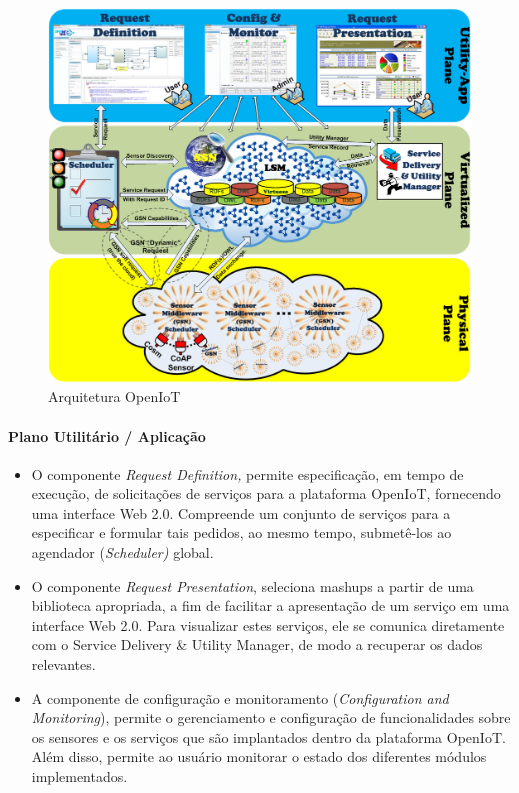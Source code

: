 \begin{figure}
\begin{centering}
\includegraphics[width=1\linewidth]{Imagens/Cap_3/OpenIoT-Architecture}
\par\end{centering}
\caption{Arquitetura OpenIoT \cite{ZShelby2009} \label{fig:OpenIoT}}
\end{figure}


\paragraph*{Plano Utilitário / Aplicação }
\begin{itemize}
\item O componente \emph{Request Definition,} permite especificação, em
tempo de execução, de solicitações de serviços para a plataforma OpenIoT,
fornecendo uma interface Web 2.0. Compreende um conjunto de serviços
para a especificar e formular tais pedidos, ao mesmo tempo, submetê-los
ao agendador (\emph{Scheduler)} global.
\item O componente \emph{Request Presentation}, seleciona mashups a partir
de uma biblioteca apropriada, a fim de facilitar a apresentação de
um serviço em uma interface Web 2.0. Para visualizar estes serviços,
ele se comunica diretamente com o Service Delivery \& Utility Manager,
de modo a recuperar os dados relevantes.
\item A componente de configuração e monitoramento (\emph{Configuration
and Monitoring}), permite o gerenciamento e configuração de funcionalidades
sobre os sensores e os serviços que são implantados dentro da plataforma
OpenIoT. Além disso, permite ao usuário monitorar o estado dos diferentes
módulos implementados.
\end{itemize}


